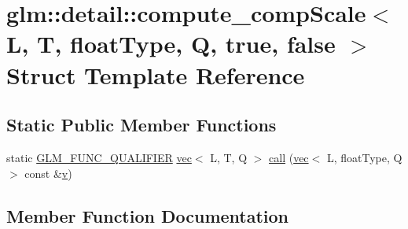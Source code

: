 \hypertarget{structglm_1_1detail_1_1compute__comp_scale_3_01_l_00_01_t_00_01float_type_00_01_q_00_01true_00_01false_01_4}{}\section{glm\+:\+:detail\+:\+:compute\+\_\+comp\+Scale$<$ L, T, float\+Type, Q, true, false $>$ Struct Template Reference}
\label{structglm_1_1detail_1_1compute__comp_scale_3_01_l_00_01_t_00_01float_type_00_01_q_00_01true_00_01false_01_4}
\subsection*{Static Public Member Functions}
\begin{DoxyCompactItemize}
\item 
static \hyperlink{setup_8hpp_a33fdea6f91c5f834105f7415e2a64407}{G\+L\+M\+\_\+\+F\+U\+N\+C\+\_\+\+Q\+U\+A\+L\+I\+F\+I\+ER} \hyperlink{structglm_1_1vec}{vec}$<$ L, T, Q $>$ \hyperlink{structglm_1_1detail_1_1compute__comp_scale_3_01_l_00_01_t_00_01float_type_00_01_q_00_01true_00_01false_01_4_a6f43175330a561e484c39041fd204fb4}{call} (\hyperlink{structglm_1_1vec}{vec}$<$ L, float\+Type, Q $>$ const \&\hyperlink{_s_d_l__opengl_8h_a10a82eabcb59d2fcd74acee063775f90}{v})
\end{DoxyCompactItemize}


\subsection{Member Function Documentation}
\mbox{\label{structglm_1_1detail_1_1compute__comp_scale_3_01_l_00_01_t_00_01float_type_00_01_q_00_01true_00_01false_01_4_a6f43175330a561e484c39041fd204fb4}} 
